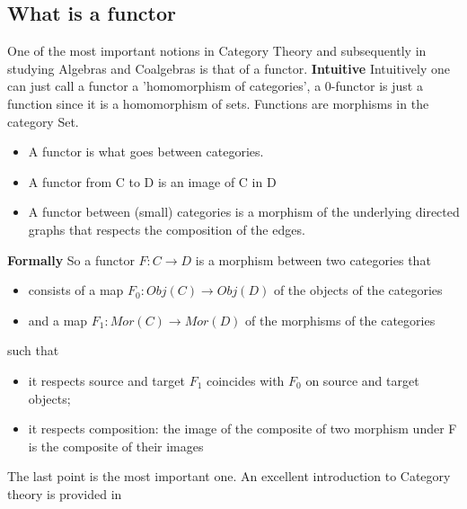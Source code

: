 \documentclass[preprint, 5p, 10pt]{elsarticle}
\theoremstyle{plain}
\begin{document}
\subsection{What is a functor}\label{Functor}
One of the most important notions in Category Theory and subsequently in studying Algebras and Coalgebras
is that of a functor. 
\textbf{Intuitive}
Intuitively one can just call a functor a 'homomorphism of categories', a 0-functor is just a function
since it is a homomorphism of sets. Functions are morphisms in the category Set. 
\begin{itemize}
 \item A functor is what goes between categories. 
\item A functor from C to D is an image of C in D
\item A functor between (small) categories is a morphism of the underlying directed graphs that respects
the composition of the edges. 
\end{itemize}
\textbf{Formally}
So a functor $F: C \rightarrow D$ is a morphism between two categories that
\begin{itemize}
 \item consists of a map $F_{0}:Obj(C) \rightarrow Obj(D)$ of the objects of the categories
\item and a map $F_{1}:Mor(C) \rightarrow Mor(D)$ of the morphisms of the categories
\end{itemize}
such that
\begin{itemize}
 \item it respects source and target $F_{1}$ coincides with $F_{0}$ on source and target objects;
\item it respects composition: the image of the composite of two morphism under F is the composite of their
images
\end{itemize}
The last point is the most important one. An excellent introduction to Category theory is provided in ~\cite{CategoryTheory}
\end{document}
